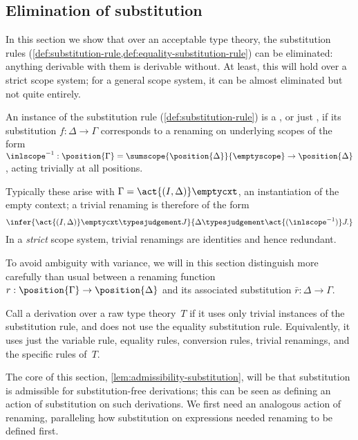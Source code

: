 \subsection{Elimination of substitution}
\label{sec:elimination-substitution}

In this section we show that over an acceptable type theory, the substitution rules (\cref{def:substitution-rule,def:equality-substitution-rule}) can be eliminated: anything derivable with them is derivable without.
%
At least, this will hold over a strict scope system;
%
for a general scope system, it can be almost eliminated but not quite entirely.

\begin{definition}
  An instance of the substitution rule (\cref{def:substitution-rule}) is a , or just , if its substitution $f : \Delta \to \Gamma$ corresponds to a renaming on underlying scopes of the form $\inlscope^{-1} : \position{\Gamma} = \sumscope{\position{\Delta}}{\emptyscope} \to \position{\Delta}$, acting trivially at all positions.
\end{definition}

Typically these arise with $\Gamma = \act{(I,\Delta)}\emptycxt$, an instantiation of the empty context;
a trivial renaming is therefore of the form
\[
  \infer{
      \act{(I,\Delta)}\emptycxt \typesjudgement J
    }{
      \Delta \typesjudgement \act{(\inlscope^{-1})} J.
    }
\]
%
In a \emph{strict} scope system, trivial renamings are identities and hence redundant.

To avoid ambiguity with variance, we will in this section distinguish more carefully than usual between a renaming function $r : \position{\Gamma} \to \position{\Delta}$ and its associated substitution $\bar{r} : \Delta \to \Gamma$.

\begin{definition}
  Call a derivation over a raw type theory~$T$  if it uses only trivial instances of the substitution rule, and does not use the equality substitution rule.
  Equivalently, it uses just the variable rule, equality rules, conversion rules, trivial renamings, and the specific rules of~$T$.
\end{definition}

The core of this section, \cref{lem:admissibility-substitution}, will be that substitution is admissible for substitution-free derivations; this can be seen as defining an action of substitution on such derivations.
%
We first need an analogous action of renaming, paralleling how substitution on expressions needed renaming to be defined first.

